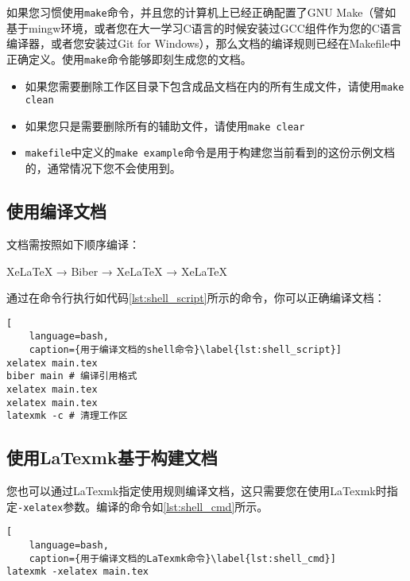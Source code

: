 如果您习惯使用\texttt{make}命令，并且您的计算机上已经正确配置了GNU Make（譬如基于mingw环境，或者您在大一学习C语言的时候安装过GCC组件作为您的C语言编译器，或者您安装过Git for Windows），那么文档的编译规则已经在Makefile中正确定义。使用\texttt{make}命令能够即刻生成您的文档。

\begin{itemize}
    \item 如果您需要删除工作区目录下包含成品文档在内的所有生成文件，请使用\texttt{make clean}
    \item 如果您只是需要删除所有的辅助文件，请使用\texttt{make clear}
    \item \texttt{makefile}中定义的\texttt{make example}命令是用于构建您当前看到的这份示例文档的，通常情况下您不会使用到。
\end{itemize}

\subsection{使用\XeLaTeX 编译文档}

文档需按照如下顺序编译：

XeLaTeX → Biber → XeLaTeX → XeLaTeX

通过在命令行执行如代码\ref{lst:shell_script}所示的命令，你可以正确编译文档：

\begin{lstlisting}[
    language=bash,
    caption={用于编译文档的shell命令}\label{lst:shell_script}]
xelatex main.tex
biber main # 编译引用格式
xelatex main.tex
xelatex main.tex
latexmk -c # 清理工作区
\end{lstlisting}

\subsection{使用LaTexmk基于\XeLaTeX 构建文档}

您也可以通过LaTexmk指定使用\XeLaTeX 规则编译文档，这只需要您在使用LaTexmk时指定\texttt{-xelatex}参数。编译的命令如\ref{lst:shell_cmd}所示。

\begin{lstlisting}[
    language=bash,
    caption={用于编译文档的LaTexmk命令}\label{lst:shell_cmd}]
latexmk -xelatex main.tex
\end{lstlisting}

